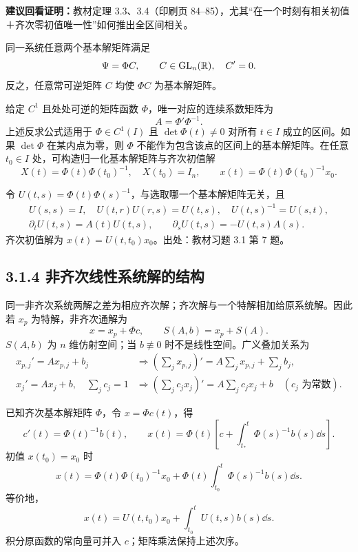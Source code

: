 \textbf{建议回看证明：}教材定理 3.3、3.4（印刷页 84--85），尤其“在一个时刻有相关初值＋齐次零初值唯一性”如何推出全区间相关。

同一系统任意两个基本解矩阵满足
\[
\Psi=\Phi C,\qquad C\in\operatorname{GL}_n(\mathbb R),\quad C'=0.
\]
反之，任意常可逆矩阵 $C$ 均使 $\Phi C$ 为基本解矩阵。

给定 $C^1$ 且处处可逆的矩阵函数 $\Phi$，唯一对应的连续系数矩阵为
\[
A=\Phi'\Phi^{-1}.
\]
上述反求公式适用于 $\Phi\in C^1(I)$ 且 $\det\Phi(t)\ne0$ 对所有 $t\in I$ 成立的区间。如果 $\det\Phi$ 在某内点为零，则 $\Phi$ 不能作为包含该点的区间上的基本解矩阵。在任意 $t_0\in I$ 处，可构造归一化基本解矩阵与齐次初值解
\[
X(t)=\Phi(t)\Phi(t_0)^{-1},\quad X(t_0)=I_n,\qquad
x(t)=\Phi(t)\Phi(t_0)^{-1}x_0.
\]

令 $U(t,s)=\Phi(t)\Phi(s)^{-1}$，与选取哪一个基本解矩阵无关，且
\begin{gather*}
U(s,s)=I,\quad U(t,r)U(r,s)=U(t,s),\quad U(t,s)^{-1}=U(s,t),\\
\partial_t U(t,s)=A(t)U(t,s),\qquad
\partial_s U(t,s)=-U(t,s)A(s).
\end{gather*}
齐次初值解为 $x(t)=U(t,t_0)x_0$。出处：教材习题 3.1 第 7 题。

\subsection*{3.1.4 非齐次线性系统解的结构}
同一非齐次系统两解之差为相应齐次解；齐次解与一个特解相加给原系统解。因此若 $x_p$ 为特解，非齐次通解为
\[
x=x_p+\Phi c,\qquad S(A,b)=x_p+S(A).
\]
$S(A,b)$ 为 $n$ 维仿射空间；当 $b\not\equiv0$ 时不是线性空间。广义叠加关系为
\[
\begin{aligned}
x_{p,j}'=Ax_{p,j}+b_j&\Rightarrow
\left(\sum_jx_{p,j}\right)'=A\sum_jx_{p,j}+\sum_jb_j,\\
x_j'=Ax_j+b,\quad\sum_jc_j=1&\Rightarrow
\left(\sum_jc_jx_j\right)'=A\sum_jc_jx_j+b
\quad(c_j\text{ 为常数}).
\end{aligned}
\]

\core 已知齐次基本解矩阵 $\Phi$，令 $x=\Phi c(t)$，得
\[
c'(t)=\Phi(t)^{-1}b(t),\qquad
x(t)=\Phi(t)\left[c+\int_{t_*}^t\Phi(s)^{-1}b(s)\dd s\right].
\]
初值 $x(t_0)=x_0$ 时
\[
\boxed{x(t)=\Phi(t)\Phi(t_0)^{-1}x_0+
\Phi(t)\int_{t_0}^t\Phi(s)^{-1}b(s)\dd s.}
\]
等价地，
\[
x(t)=U(t,t_0)x_0+\int_{t_0}^t U(t,s)b(s)\dd s.
\]
积分原函数的常向量可并入 $c$；矩阵乘法保持上述次序。

